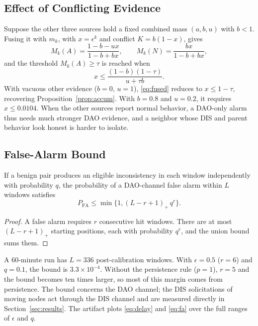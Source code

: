 \subsection{Effect of Conflicting Evidence}
Suppose the other three sources hold a fixed combined mass $(a,b,u)$ with $b<1$. Fusing it with $m_k$, with $x=\epsilon^k$ and conflict $K=b(1-x)$, gives
\begin{equation}
 M_k(A)=\frac{1-b-ux}{1-b+bx},\qquad M_k(N)=\frac{bx}{1-b+bx},
\end{equation}
and the threshold $M_k(A)\ge\tau$ is reached when
\begin{equation}
 x\le\frac{(1-b)(1-\tau)}{u+\tau b}.
 \label{eq:fused}
\end{equation}
With vacuous other evidence ($b=0$, $u=1$), \eqref{eq:fused} reduces to $x\le1-\tau$, recovering Proposition~\ref{prop:accum}. With $b=0.8$ and $u=0.2$, it requires $x\le0.0104$. When the other sources report normal behavior, a DAO-only alarm thus needs much stronger DAO evidence, and a neighbor whose DIS and parent behavior look honest is harder to isolate.

\subsection{False-Alarm Bound}
\begin{proposition}\label{prop:fa}
If a benign pair produces an eligible inconsistency in each window independently with probability $q$, the probability of a DAO-channel false alarm within $L$ windows satisfies
\begin{equation}
 P_{\mathrm{FA}}\le\min\{1,(L-r+1)_+\,q^r\}.
 \label{eq:fa}
\end{equation}
\end{proposition}
\begin{proof}
A false alarm requires $r$ consecutive hit windows. There are at most $(L-r+1)_+$ starting positions, each with probability $q^r$, and the union bound sums them.
\end{proof}
A 60-minute run has $L=336$ post-calibration windows. With $\epsilon=0.5$ ($r=6$) and $q=0.1$, the bound is $3.3\times10^{-4}$. Without the persistence rule ($p=1$), $r=5$ and the bound becomes ten times larger, so most of this margin comes from persistence. The bound concerns the DAO channel; the DIS solicitations of moving nodes act through the DIS channel and are measured directly in Section~\ref{sec:results}. The artifact plots \eqref{eq:delay} and \eqref{eq:fa} over the full ranges of $\epsilon$ and $q$.

